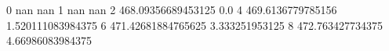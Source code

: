 0 nan nan
1 nan nan
2 468.09356689453125 0.0
4 469.6136779785156 1.520111083984375
6 471.42681884765625 3.333251953125
8 472.763427734375 4.66986083984375
